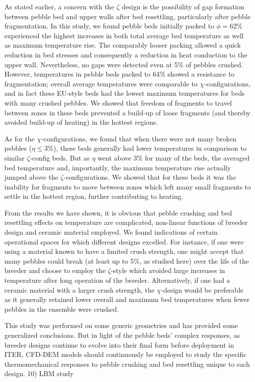As stated earlier, a concern with the $\zeta$ design is the possibility of gap formation between pebble bed and upper walls after bed resettling, particularly after pebble fragmentation. In this study, we found pebble beds initially packed to $\phi = 62\%$ experienced the highest increases in both total average bed temperature as well as maximum temperature rise. The comparably looser packing allowed a quick reduction in bed stresses and consequently a reduction in heat conduction to the upper wall. Nevertheless, no gaps were detected even at 5\% of pebbles crushed. However, temperatures in pebble beds packed to 64\% showed a resistance to fragmentation; overall average temperatures were comparable to $\chi$-configurations, and in fact these EU-style beds had the lowest maximum temperatures for beds with many crushed pebbles. We showed that freedom of fragments to travel between zones in these beds prevented a build-up of loose fragments (and thereby avoided build-up of heating) in the hottest regions.

As for the $\chi$-configurations, we found that when there were not many broken pebbles ($\eta \le 3$\%), these beds generally had lower temperatures in comparison to similar $\zeta$-config beds. But as $\eta$ went above 3\% for many of the beds, the averaged bed temperature and, importantly, the maximum temperature rise actually jumped above the $\zeta$-configurations. We showed that for these beds it was the inability for fragments to move between zones which left many small fragments to settle in the hottest region, further contributing to heating.

From the results we have shown, it is obvious that pebble crushing and bed resettling effects on temperature are complicated, non-linear functions of breeder design and ceramic material employed. We found indications of certain operational spaces for which different designs excelled. For instance, if one were using a material known to have a limited crush strength, one might accept that many pebbles could break (at least up to 5\%, as studied here) over the life of the breeder and choose to employ the $\zeta$-style which avoided large increases in temperature after long operation of the breeder. Alternatively, if one had a ceramic material with a larger crush strength, the $\chi$-design would be preferable as it generally retained lower overall and maximum bed temperatures when fewer pebbles in the ensemble were crushed.

This study was performed on some generic geometries and has provided some generalized conclusions. But in light of the pebble beds' complex responses, as breeder designs continue to evolve into their final form before deployment in ITER, CFD-DEM models should continuously be employed to study the specific thermomechanical responses to pebble crushing and bed resettling unique to each design.
10) LBM study

